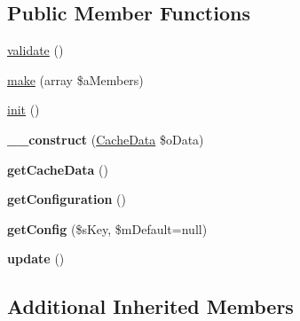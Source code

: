 \subsection*{Public Member Functions}
\begin{DoxyCompactItemize}
\item 
\hyperlink{class_cacheable_ab70b135c0d4c3c3db6be09057ec7e361}{validate} ()
\item 
\hyperlink{class_cacheable_a1443eacff201d0317e4481cda75eb44b}{make} (array \$a\-Members)
\item 
\hyperlink{class_cacheable_a3bda7dd0df982212ce5817b5a30f2284}{init} ()
\item 
\hypertarget{class_cacheable_a16d53ddf3c4ac7217c32df7f0d763454}{{\bfseries \-\_\-\-\_\-construct} (\hyperlink{class_cache_data}{Cache\-Data} \$o\-Data)}\label{class_cacheable_a16d53ddf3c4ac7217c32df7f0d763454}

\item 
\hypertarget{class_cacheable_a3825ea17270319f96d27540ae347fcde}{{\bfseries get\-Cache\-Data} ()}\label{class_cacheable_a3825ea17270319f96d27540ae347fcde}

\item 
\hypertarget{class_cacheable_a1a737bc8da70a953cc9d21a7654aab6d}{{\bfseries get\-Configuration} ()}\label{class_cacheable_a1a737bc8da70a953cc9d21a7654aab6d}

\item 
\hypertarget{class_cacheable_a525b1b070b6f528c6bbe1df12194fab1}{{\bfseries get\-Config} (\$s\-Key, \$m\-Default=null)}\label{class_cacheable_a525b1b070b6f528c6bbe1df12194fab1}

\item 
\hypertarget{class_cacheable_a56e3abe8d080d88755b8adb36abbe7bd}{{\bfseries update} ()}\label{class_cacheable_a56e3abe8d080d88755b8adb36abbe7bd}

\end{DoxyCompactItemize}
\subsection*{Additional Inherited Members}


